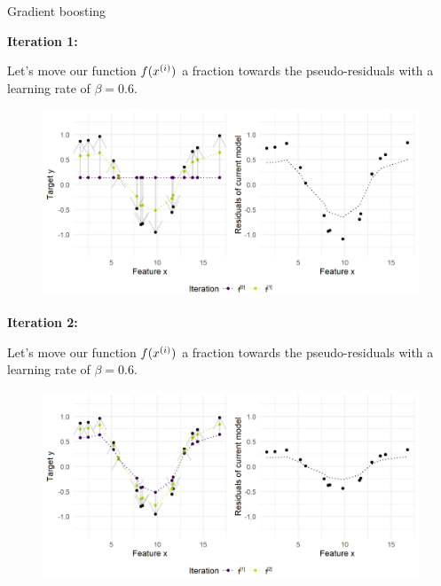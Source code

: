 \begin{vbframe}{Gradient boosting}

\textbf{Iteration 1:}

Let's move our function $f(x^{(i)})$ a fraction towards the pseudo-residuals with a learning rate of $\beta = 0.6$.


\begin{figure}
  \includegraphics[width=\textwidth]{figure/fig-gb-concept-pseudo-resi-1.png}
\end{figure}

\framebreak

\textbf{Iteration 2:}

Let's move our function $f(x^{(i)})$ a fraction towards the pseudo-residuals with a learning rate of $\beta = 0.6$.


\begin{figure}
  \includegraphics[width=\textwidth]{figure/fig-gb-concept-pseudo-resi-2.png}
\end{figure}

\framebreak
\begin{footnotesize}



\end{footnotesize}
\end{vbframe}
